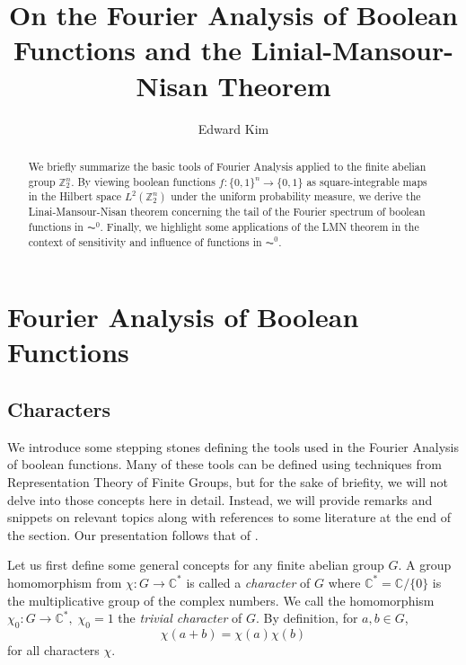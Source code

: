 \documentclass{amsart}
\theoremstyle{definition}
\theoremstyle{remark}
\numberwithin{equation}{section}
\theoremstyle{remark}
\begin{document}
\title{On the Fourier Analysis of Boolean Functions and the Linial-Mansour-Nisan Theorem}

\author{Edward Kim}

\begin{abstract}
  We briefly summarize the basic tools of Fourier Analysis applied to the finite abelian group $\mathbb{Z}_2^n$. By viewing boolean functions $f:\{0,1\}^n \rightarrow \{0,1\}$ as square-integrable maps in the Hilbert space $L^2(\mathbb{Z}_2^n)$ under the uniform probability measure, we derive the Linai-Mansour-Nisan theorem concerning the tail of the Fourier spectrum of boolean functions in $\AC^0$. Finally, we highlight some applications of the LMN theorem in the context of sensitivity and influence of functions in $\AC^0$.
\end{abstract}

\maketitle

\section{Fourier Analysis of Boolean Functions}

\subsection{Characters}

We introduce some stepping stones defining the tools used in the Fourier Analysis of boolean functions. Many of these tools can be defined using techniques from Representation Theory of Finite Groups, but for the sake of briefity, we will not delve into those concepts here in detail. Instead, we will provide remarks and snippets on relevant topics along with references to some literature at the end of the section. Our presentation follows that of \cite{hatami}. \newline

Let us first define some general concepts for any finite abelian group $G$. A group homomorphism from $\chi: G \rightarrow \mathbb{C}^*$ is called a \emph{character} of $G$ where $\mathbb{C}^* = \mathbb{C}/\{0\}$ is the multiplicative group of the complex numbers. We call the homomorphism $\chi_0:G \rightarrow \mathbb{C}^*, \; \chi_0 = 1$ the \emph{trivial character} of $G$. By definition, for $a,b \in G$,
\begin{equation} \label{homo}
\chi(a + b) = \chi(a)\chi(b)
\end{equation}
for all characters $\chi$. \newline
\end{document}
